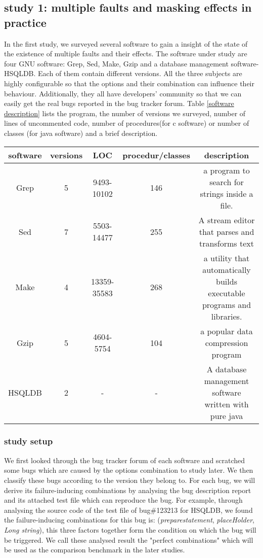 \documentclass{sig-alternate}
\begin{document}
\subsection{study 1: multiple faults and masking effects in practice}
In the first study, we surveyed several software to gain a insight of the state of the existence of multiple faults and their effects. The software under study are four GNU software: Grep, Sed, Make, Gzip and a database management software- HSQLDB. Each of them contain different versions. All the three subjects are highly configurable so that the options and their combination can influence their behaviour. Additionally, they all have developers' community so that we can easily get the real bugs reported in the bug tracker forum. Table \ref{software description} lists the program, the number of versions we surveyed, number of lines of uncommented code, number of procedures(for c software) or number of classes (for java software) and a brief description.

\begin{table*}\renewcommand{\arraystretch}{1.3}
\caption{Software under survey}
\label{software description}
\begin{tabular}{c|c|c|c|c} \hline
software & versions & LOC & procedur/classes & description\\ \hline
Grep & 5 &  9493-10102 &146 &  a program to search for strings inside a file.\\ \hline
Sed & 7 & 5503-14477  & 255& A stream editor that parses and transforms text \\ \hline
Make & 4 &  13359-35583 &268&   a utility that automatically builds executable programs and libraries. \\ \hline
Gzip &5 &  4604-5754 &104&  a popular data compression program \\ \hline
HSQLDB &2 & - &-& A database management software written with pure java\\
\hline\end{tabular}
\end{table*}

\subsubsection{study setup}
We first looked through the bug tracker forum of each software and scratched some bugs which are caused by the options combination to study later. We then classify these bugs according to the version they belong to. For each bug, we will derive its failure-inducing combinations by analysing the bug description report and its attached test file which can reproduce the bug. For example, through analysing the source code of the test file of bug\#123213 for HSQLDB, we found the failure-inducing combinations for this bug is: (\emph{preparestatement}, \emph{placeHolder}, \emph{Long string}), this three factors together form the condition on which the bug will be triggered.  We call these analysed result the "perfect combinations" which will be used as the comparison benchmark in the later studies.
\end{document}

